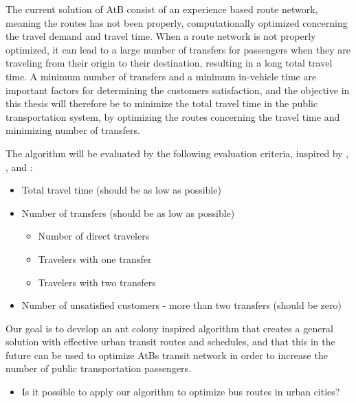 The current solution of AtB \citep{website:atb} consist of an experience based route network, meaning the routes has not been properly, computationally optimized concerning the travel demand and travel time. When a route network is not properly optimized, it can lead to a large number of transfers for passengers when they are traveling from their origin to their destination, resulting in a long total travel time. A minimum number of transfers and a minimum in-vehicle time are important factors for determining the customers satisfaction, and the objective in this thesis will therefore be to minimize the total travel time in the public transportation system, by optimizing the routes concerning the travel time and minimizing number of transfers. %

The algorithm will be evaluated by the following evaluation criteria, inspired by \citep{kechagiopoulos14}, \citep{mandl80}, \citep{nikolic14} and \citep{fan09}: 
\begin{itemize}
\item Total travel time (should be as low as possible)
\item Number of transfers (should be as low as possible)
\begin{itemize}
\item Number of direct travelers
\item Travelers with one transfer
\item Travelers with two transfers
\end{itemize}
\item Number of unsatisfied customers - more than two transfers (should be zero)
\end{itemize}

Our goal is to develop an ant colony inspired algorithm that creates a general solution with effective urban transit routes and schedules, and that this in the future can be used to optimize AtBs transit network in order to increase the number of public transportation passengers. 
\begin{itemize}
\item Is it possible to apply our algorithm to optimize bus routes in urban cities?
\end{itemize}
